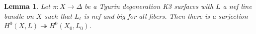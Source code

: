 \documentclass[a4paper]{amsart}
\theoremstyle{definition}
\theoremstyle{plain}
\newtheorem{lemma}[defn]{Lemma}
\theoremstyle{remark}
\newcommand\jamesline[1]{\todo[inline,color=yellow!40]{#1}} %
\begin{document}

\begin{lemma}\label{sections on central fiber come from global}
Let $\pi:X \rightarrow \Delta$ be a Tyurin degeneration K3 surfaces with $L$ a nef line bundle on $X$ such that $L_t$ is nef and big for all fibers. Then there is a surjection $H^0(X,L) \twoheadrightarrow H^0(X_0,L_0)$.
\end{lemma}
\end{document}
